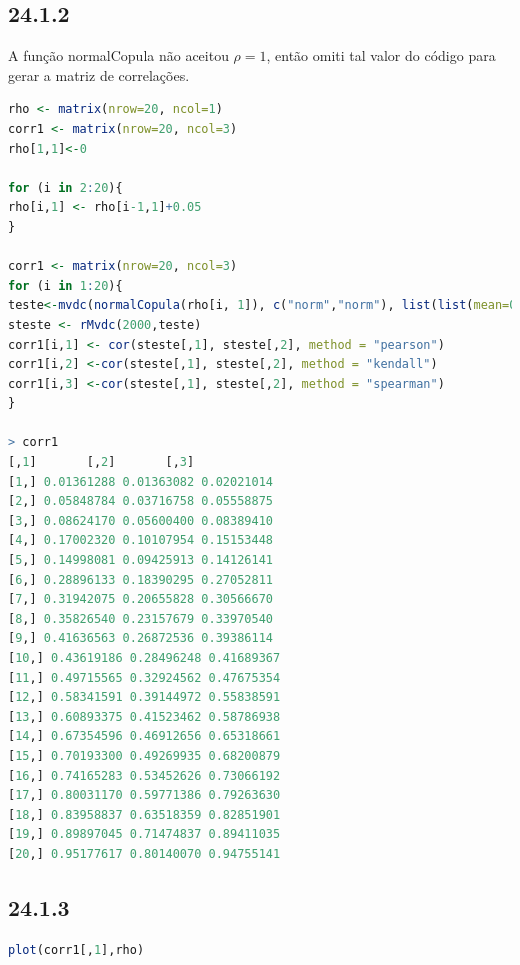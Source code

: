\documentclass[12pt]{article}
\begin{document}
\subsection*{24.1.2}
A função normalCopula não aceitou $\rho=1$, então omiti tal valor do código para gerar a matriz de correlações.
\begin{lstlisting}[language=R]
rho <- matrix(nrow=20, ncol=1)
corr1 <- matrix(nrow=20, ncol=3)
rho[1,1]<-0

for (i in 2:20){
rho[i,1] <- rho[i-1,1]+0.05
}

corr1 <- matrix(nrow=20, ncol=3)
for (i in 1:20){
teste<-mvdc(normalCopula(rho[i, 1]), c("norm","norm"), list(list(mean=0,sd=1),list(mean=0,sd=1)))
steste <- rMvdc(2000,teste)
corr1[i,1] <- cor(steste[,1], steste[,2], method = "pearson")
corr1[i,2] <-cor(steste[,1], steste[,2], method = "kendall")
corr1[i,3] <-cor(steste[,1], steste[,2], method = "spearman")
}

> corr1
[,1]       [,2]       [,3]
[1,] 0.01361288 0.01363082 0.02021014
[2,] 0.05848784 0.03716758 0.05558875
[3,] 0.08624170 0.05600400 0.08389410
[4,] 0.17002320 0.10107954 0.15153448
[5,] 0.14998081 0.09425913 0.14126141
[6,] 0.28896133 0.18390295 0.27052811
[7,] 0.31942075 0.20655828 0.30566670
[8,] 0.35826540 0.23157679 0.33970540
[9,] 0.41636563 0.26872536 0.39386114
[10,] 0.43619186 0.28496248 0.41689367
[11,] 0.49715565 0.32924562 0.47675354
[12,] 0.58341591 0.39144972 0.55838591
[13,] 0.60893375 0.41523462 0.58786938
[14,] 0.67354596 0.46912656 0.65318661
[15,] 0.70193300 0.49269935 0.68200879
[16,] 0.74165283 0.53452626 0.73066192
[17,] 0.80031170 0.59771386 0.79263630
[18,] 0.83958837 0.63518359 0.82851901
[19,] 0.89897045 0.71474837 0.89411035
[20,] 0.95177617 0.80140070 0.94755141
\end{lstlisting}

\subsection*{24.1.3}

\begin{lstlisting}[language=R]
plot(corr1[,1],rho)
\end{lstlisting}
\end{document}
